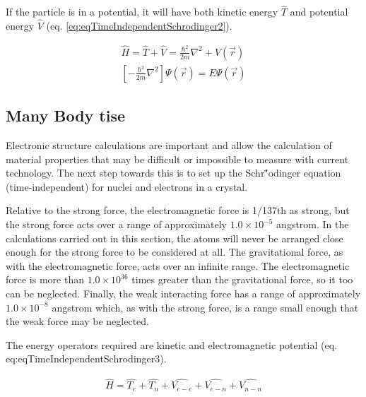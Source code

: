 If the particle is in a potential, it will have both kinetic energy $\hat{T}$ and potential energy $\hat{V}$ (eq. \ref{eq:eqTimeIndependentSchrodinger2}).

\begin{equation}
\begin{split}
\hat{H} = \hat{T} + \hat{V} = \frac{\hbar^2}{2 m} \nabla^2 + V(\vec{r})\\
\left[-\frac{\hbar^2}{2 m} \nabla^2 \right] \Psi(\vec{r}) = E \Psi(\vec{r})
\end{split}
\label{eq:eqTimeIndependentSchrodinger2}
\end{equation}




\subsection{Many Body \acrshort{tise}}

Electronic structure calculations are important and allow the calculation of material properties that may be difficult or impossible to measure with current technology.  The next step towards this is to set up the Schr\""{o}dinger equation (time-independent) for nuclei and electrons in a crystal.  

Relative to the strong force, the electromagnetic force is 1/137th as strong, but the strong force acts over a range of approximately $1.0 \times 10^{-5}$ angstrom.  In the calculations carried out in this section, the atoms will never be arranged close enough for the strong force to be considered at all.  The gravitational force, as with the electromagnetic force, acts over an infinite range.  The electromagnetic force is more than $1.0 \times 10^{36}$ times greater than the gravitational force, so it too can be neglected.  Finally, the weak interacting force has a range of approximately $1.0 \times 10^{-8}$ angstrom which, as with the strong force, is a range small enough that the weak force may be neglected.

The energy operators required are kinetic and electromagnetic potential (eq. {eq:eqTimeIndependentSchrodinger3}).

\begin{equation}
\begin{split}
\hat{H} = \hat{T_e} + \hat{T_n} + \hat{V_{e-e}} + \hat{V_{e-n}} + \hat{V_{n-n}}
\end{split}
\label{eq:eqTimeIndependentSchrodinger3}
\end{equation}


